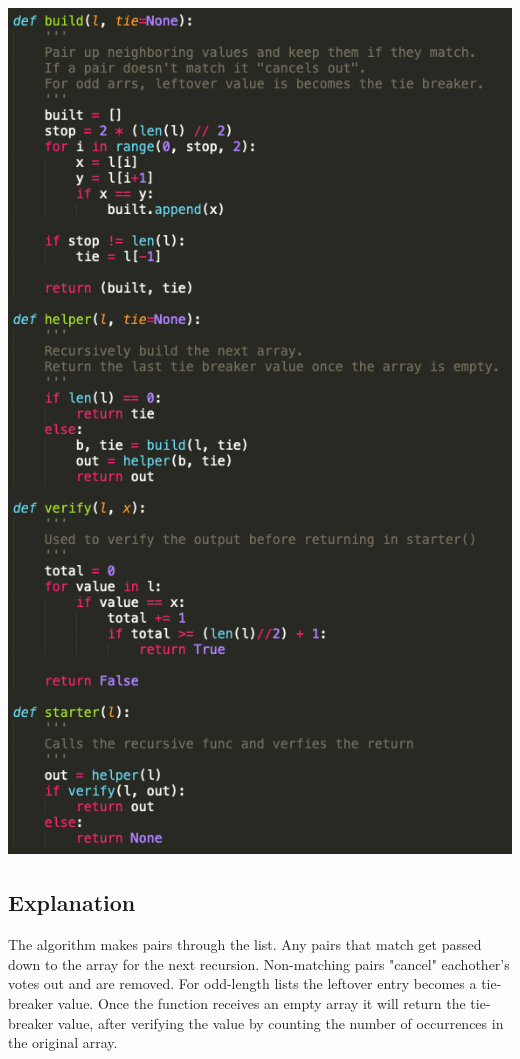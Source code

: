 \documentclass[11pt]{article}
\begin{document}
\includegraphics[scale=0.4]{majority_code.png}


\subsection*{Explanation}
The algorithm makes pairs through the list. Any pairs that match get passed down to the array for the next recursion. Non-matching pairs "cancel" eachother's votes out and are removed. For odd-length lists the leftover entry becomes a tie-breaker value. Once the function receives an empty array it will return the tie-breaker value, after verifying the value by counting the number of occurrences in the original array. 
\end{document}
